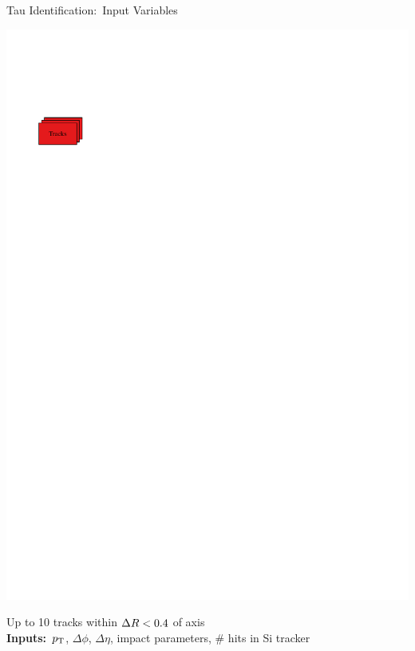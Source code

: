 \documentclass[11pt, xcolor={dvipsnames}, aspectratio=169, notes]{beamer}
\begin{document}
\begin{frame}{Tau Identification:\ Input Variables}
\begin{minipage}[c][2.2cm][c]{0.25\textwidth}
    \includegraphics[scale=1]{tauid/track_icon}
  \end{minipage}%
  \begin{minipage}[c][2.2cm][c]{0.75\textwidth}
    Up to 10 tracks within $\Delta R < 0.4$ of \tauhadvis axis\\[0.5\baselineskip]
    \textbf{Inputs:}\ $p_{\text{T}}$, $\Delta \phi$, $\Delta \eta$, impact parameters, \#
    hits in Si tracker
  \end{minipage}%


  \begin{minipage}[c][2.2cm][c]{0.25\textwidth}
    \centering


\end{minipage}
\end{frame}
\end{document}
